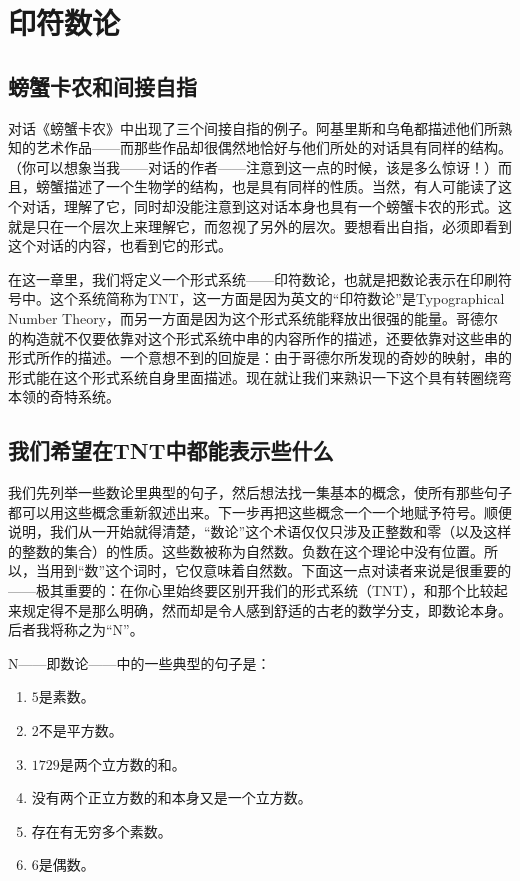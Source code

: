 
\chapter{印符数论}

\section{螃蟹卡农和间接自指}

对话《螃蟹卡农》中出现了三个间接自指的例子。阿基里斯和乌龟都描述他们所熟知的艺术作品——而那些作品却很偶然地恰好与他们所处的对话具有同样的结构。（你可以想象当我——对话的作者——注意到这一点的时候，该是多么惊讶！）而且，螃蟹描述了一个生物学的结构，也是具有同样的性质。当然，有人可能读了这个对话，理解了它，同时却没能注意到这对话本身也具有一个螃蟹卡农的形式。这就是只在一个层次上来理解它，而忽视了另外的层次。要想看出自指，必须即看到这个对话的内容，也看到它的形式。

在这一章里，我们将定义一个形式系统——印符数论，也就是把数论表示在印刷符号中。这个系统简称为TNT，这一方面是因为英文的“印符数论”是Typographical Number Theory，而另一方面是因为这个形式系统能释放出很强的能量。哥德尔的构造就不仅要依靠对这个形式系统中串的内容所作的描述，还要依靠对这些串的形式所作的描述。一个意想不到的回旋是：由于哥德尔所发现的奇妙的映射，串的形式能在这个形式系统自身里面描述。现在就让我们来熟识一下这个具有转圈绕弯本领的奇特系统。

\section{我们希望在TNT中都能表示些什么}

我们先列举一些数论里典型的句子，然后想法找一集基本的概念，使所有那些句子都可以用这些概念重新叙述出来。下一步再把这些概念一个一个地赋予符号。顺便说明，我们从一开始就得清楚，“数论”这个术语仅仅只涉及正整数和零（以及这样的整数的集合）的性质。这些数被称为自然数。负数在这个理论中没有位置。所以，当用到“数”这个词时，它仅意味着自然数。下面这一点对读者来说是很重要的——极其重要的：在你心里始终要区别开我们的形式系统（TNT），和那个比较起来规定得不是那么明确，然而却是令人感到舒适的古老的数学分支，即数论本身。后者我将称之为“N”。

N——即数论——中的一些典型的句子是：
\begin{enumerate}
\item $5$是素数。
\item $2$不是平方数。
\item $1729$是两个立方数的和。
\item 没有两个正立方数的和本身又是一个立方数。
\item 存在有无穷多个素数。
\item $6$是偶数。
\end{enumerate}

